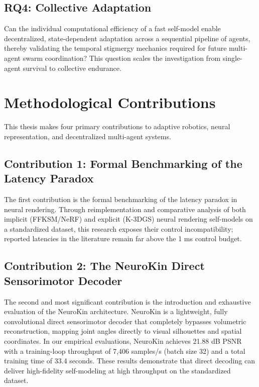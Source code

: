 \documentclass[12pt,a4paper,oneside]{report}
\begin{document}
\subsection{RQ4: Collective Adaptation}
\label{subsec:RQ4}

Can the individual computational efficiency of a fast self-model enable decentralized, state-dependent adaptation across a sequential pipeline of agents, thereby validating the temporal stigmergy mechanics required for future multi-agent swarm coordination? This question scales the investigation from single-agent survival to collective endurance.

\section{Methodological Contributions}
\label{sec:methodological_contributions}

This thesis makes four primary contributions to adaptive robotics, neural representation, and decentralized multi-agent systems.

\subsection{Contribution 1: Formal Benchmarking of the Latency Paradox}
\label{subsec:contrib_benchmarking}

The first contribution is the formal benchmarking of the latency paradox in neural rendering. Through reimplementation and comparative analysis of both implicit (FFKSM/NeRF) and explicit (K-3DGS) neural rendering self-models on a standardized dataset, this research exposes their control incompatibility; reported latencies in the literature remain far above the 1 ms control budget.

\subsection{Contribution 2: The NeuroKin Direct Sensorimotor Decoder}
\label{subsec:contrib_neurokin}

The second and most significant contribution is the introduction and exhaustive evaluation of the NeuroKin architecture. NeuroKin is a lightweight, fully convolutional direct sensorimotor decoder that completely bypasses volumetric reconstruction, mapping joint angles directly to visual silhouettes and spatial coordinates. In our empirical evaluations, NeuroKin achieves 21.88 dB PSNR with a training-loop throughput of 7,406 samples/s (batch size 32) and a total training time of 33.4 seconds. These results demonstrate that direct decoding can deliver high-fidelity self-modeling at high throughput on the standardized dataset.
\end{document}
